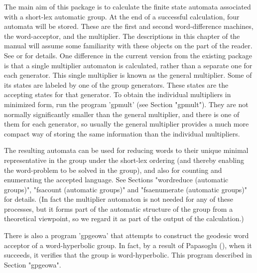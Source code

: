 
The main aim of this package is to calculate the finite state automata
associated with a short-lex automatic group. At the end of a
successful calculation, four automata will be stored. These are the first
and second word-difference machines, the word-acceptor, and the multiplier.
The descriptions in this  chapter of the manual will assume some familiarity
with these objects on the part of the reader.
See \cite{EHR91} or \cite{Holt94} for details. One difference in the
current version from the existing {\Automata} package
is that a single multiplier automaton is calculated,
rather than a separate one for each generator.
This single multiplier is known as the general multiplier. Some of its states
are labeled by one of the group generators. These states are the accepting
states for that generator. To obtain the individual multipliers in minimized
form, run the program 'gpmult' (see Section "gpmult"). They are not normally
significantly smaller than the general multiplier, and there is one of them
for each generator, so usually the general multiplier provides a much more
compact way of storing the same information than the individual multipliers.

The resulting automata
can be used for reducing words to their unique minimal representative in
the group under the short-lex ordering (and thereby enabling the
word-problem to be solved in the group), and also for counting and
enumerating the accepted language.
See Sections "wordreduce (automatic groups)", "fsacount (automatic groups)"
and "fsaenumerate (automatic groups)" for details.
(In fact the multiplier automaton is not needed for any of these processes,
but it forms part of the automatic structure of the group from a
theoretical viewpoint, so we regard it as part of the output of the
calculation.)

There is also a program 'gpgeowa' that attempts to construct the geodesic
word acceptor of a word-hyperbolic group. In fact, by a result of
Papasoglu (\cite{PAP}), when it succeeds, it verifies that the
group is  word-hyperbolic. This program described in Section "gpgeowa".

